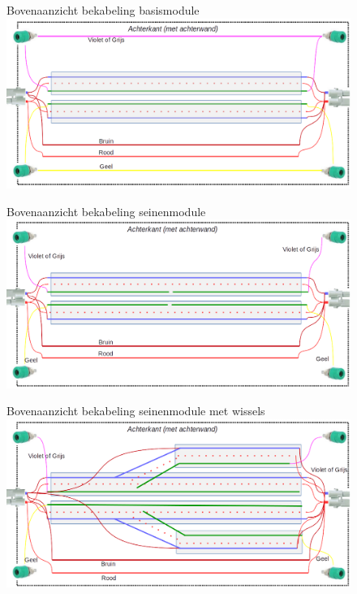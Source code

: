 \documentclass[12pt,a4paper]{report}
\begin{document}
\begin{figure}[!ht]
  \captionbox
  {Bovenaanzicht bekabeling basismodule\label{im:modulebak}}
  {\includegraphics[scale=0.6]{images/rcu_modulebak}}
\end{figure}

\begin{figure}[!ht]
  \captionbox
  {Bovenaanzicht bekabeling seinenmodule\label{im:modulebak_seinen}}
  {\includegraphics[scale=0.6]{images/rcu_modulebak_seinen}}
\end{figure}

\begin{figure}[!ht]
  \captionbox
  {Bovenaanzicht bekabeling seinenmodule met wissels\label{im:modulebak_seinen_wissels}}
  {\includegraphics[scale=0.6]{images/rcu_modulebak_seinen_wissels}}
\end{figure}
\end{document}
